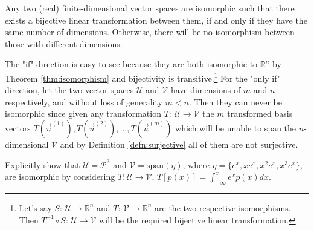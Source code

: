 \begin{proper}
\label{proper:isomorphicsamerank}
Any two (real) finite-dimensional vector spaces are isomorphic such that there exists a bijective linear transformation between them, if and only if they have the same number of dimensions. Otherwise, there will be no isomorphism between those with different dimensions.
\end{proper}
The "if" direction is easy to see because they are both isomorphic to $\mathbb{R}^n$ by Theorem \ref{thm:isomorphism} and bijectivity is transitive.\footnote{Let's say $S$: $\mathcal{U} \to \mathbb{R}^n$ and $T$: $\mathcal{V} \to \mathbb{R}^n$ are the two respective isomorphisms. Then $T^{-1} \circ S$: $\mathcal{U} \to \mathcal{V}$ will be the required bijective linear transformation.} For the "only if" direction, let the two vector spaces $\mathcal{U}$ and $\mathcal{V}$ have dimensions of $m$ and $n$ respectively, and without loss of generality $m < n$. Then they can never be isomorphic since given any transformation $T$: $\mathcal{U} \to \mathcal{V}$ the $m$ transformed basis vectors $T(\vec{u}^{(1)}), T(\vec{u}^{(2)}), \ldots, T(\vec{u}^{(m)})$ which will be unable to span the $n$-dimensional $\mathcal{V}$ and by Definition \ref{defn:surjective} all of them are not surjective.
\begin{exmp}
Explicitly show that $\mathcal{U} = \mathcal{P}^3$ and $\mathcal{V} = \text{span}(\mathcal{\eta})$, where $\mathcal{\eta} = \{e^x, xe^x, x^2e^x, x^3e^x\}$, are isomorphic by considering $T: \mathcal{U} \to \mathcal{V}$, $T[p(x)] = \int_{-\infty}^x e^x p(x) dx$.
\end{exmp}
